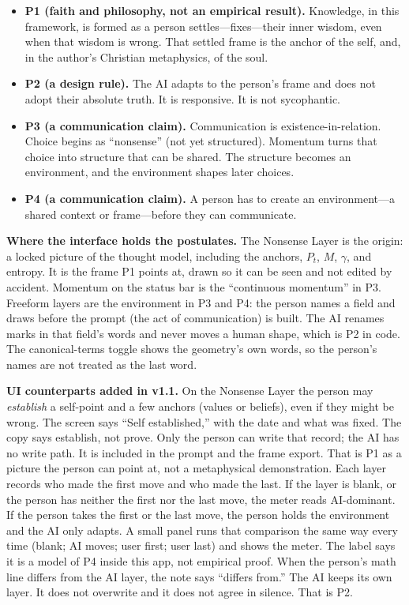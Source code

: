 \documentclass[11pt]{article}
\begin{document}
\begin{itemize}[leftmargin=1.2em]
\item \textbf{P1 (faith and philosophy, not an empirical result).} Knowledge, in this framework, is formed as a person settles---fixes---their inner wisdom, even when that wisdom is wrong. That settled frame is the anchor of the self, and, in the author's Christian metaphysics, of the soul.
\item \textbf{P2 (a design rule).} The AI adapts to the person's frame and does not adopt their absolute truth. It is responsive. It is not sycophantic.
\item \textbf{P3 (a communication claim).} Communication is existence-in-relation. Choice begins as ``nonsense'' (not yet structured). Momentum turns that choice into structure that can be shared. The structure becomes an environment, and the environment shapes later choices.
\item \textbf{P4 (a communication claim).} A person has to create an environment---a shared context or frame---before they can communicate.
\end{itemize}

\textbf{Where the interface holds the postulates.} The Nonsense Layer is the origin: a locked picture of the thought model, including the anchors, $P_t$, $M$, $\gamma$, and entropy. It is the frame P1 points at, drawn so it can be seen and not edited by accident. Momentum on the status bar is the ``continuous momentum'' in P3. Freeform layers are the environment in P3 and P4: the person names a field and draws before the prompt (the act of communication) is built. The AI renames marks in that field's words and never moves a human shape, which is P2 in code. The canonical-terms toggle shows the geometry's own words, so the person's names are not treated as the last word.

\textbf{UI counterparts added in v1.1.} On the Nonsense Layer the person may \emph{establish} a self-point and a few anchors (values or beliefs), even if they might be wrong. The screen says ``Self established,'' with the date and what was fixed. The copy says establish, not prove. Only the person can write that record; the AI has no write path. It is included in the prompt and the frame export. That is P1 as a picture the person can point at, not a metaphysical demonstration. Each layer records who made the first move and who made the last. If the layer is blank, or the person has neither the first nor the last move, the meter reads AI-dominant. If the person takes the first or the last move, the person holds the environment and the AI only adapts. A small panel runs that comparison the same way every time (blank; AI moves; user first; user last) and shows the meter. The label says it is a model of P4 inside this app, not empirical proof. When the person's math line differs from the AI layer, the note says ``differs from.'' The AI keeps its own layer. It does not overwrite and it does not agree in silence. That is P2.
\end{document}
